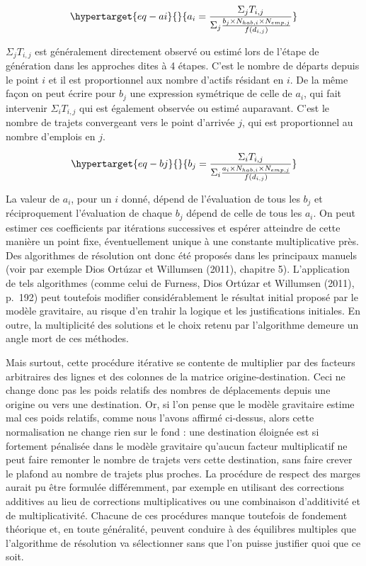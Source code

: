 \documentclass[
  10pt,
  a4paper,
  numbers=noendperiod,
  DIV=12]{scrartcl}
\begin{document}
\begin{equation}\protect\hypertarget{eq-ai}{}{
a_i = \frac {\Sigma_j T_{i,j}} {\Sigma_j \frac {b_j \times N_{hab, i} \times N_{emp, j}}{f(d_{i,j})}} 
}\label{eq-ai}\end{equation}

\(\Sigma_j T_{i,j}\) est généralement directement observé ou estimé lors
de l'étape de génération dans les approches dites à 4 étapes. C'est le
nombre de départs depuis le point \(i\) et il est proportionnel aux
nombre d'actifs résidant en \(i\). De la même façon on peut écrire pour
\(b_j\) une expression symétrique de celle de \(a_i\), qui fait
intervenir \(\Sigma_i T_{i,j}\) qui est également observée ou estimé
auparavant. C'est le nombre de trajets convergeant vers le point
d'arrivée \(j\), qui est proportionnel au nombre d'emplois en \(j\).

\begin{equation}\protect\hypertarget{eq-bj}{}{
b_j = \frac {\Sigma_i T_{i,j}} {\Sigma_i \frac {a_i \times N_{hab, i} \times N_{emp, j}}{f(d_{i,j})}} 
}\label{eq-bj}\end{equation}

La valeur de \(a_i\), pour un \(i\) donné, dépend de l'évaluation de
tous les \(b_j\) et réciproquement l'évaluation de chaque \(b_j\) dépend
de celle de tous les \(a_i\). On peut estimer ces coefficients par
itérations successives et espérer atteindre de cette manière un point
fixe, éventuellement unique à une constante multiplicative près. Des
algorithmes de résolution ont donc été proposés dans les principaux
manuels (voir par exemple Dios Ortúzar et Willumsen (2011), chapitre 5).
L'application de tels algorithmes (comme celui de Furness, Dios Ortúzar
et Willumsen (2011), p.~192) peut toutefois modifier considérablement le
résultat initial proposé par le modèle gravitaire, au risque d'en trahir
la logique et les justifications initiales. En outre, la multiplicité
des solutions et le choix retenu par l'algorithme demeure un angle mort
de ces méthodes.

Mais surtout, cette procédure itérative se contente de multiplier par
des facteurs arbitraires des lignes et des colonnes de la matrice
origine-destination. Ceci ne change donc pas les poids relatifs des
nombres de déplacements depuis une origine ou vers une destination. Or,
si l'on pense que le modèle gravitaire estime mal ces poids relatifs,
comme nous l'avons affirmé ci-dessus, alors cette normalisation ne
change rien sur le fond : une destination éloignée est si fortement
pénalisée dans le modèle gravitaire qu'aucun facteur multiplicatif ne
peut faire remonter le nombre de trajets vers cette destination, sans
faire crever le plafond au nombre de trajets plus proches. La procédure
de respect des marges aurait pu être formulée différemment, par exemple
en utilisant des corrections additives au lieu de corrections
multiplicatives ou une combinaison d'additivité et de multiplicativité.
Chacune de ces procédures manque toutefois de fondement théorique et, en
toute généralité, peuvent conduire à des équilibres multiples que
l'algorithme de résolution va sélectionner sans que l'on puisse
justifier quoi que ce soit.
\end{document}
